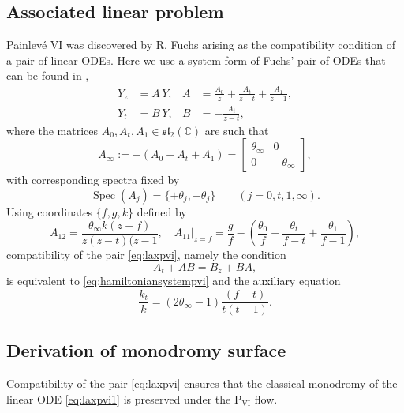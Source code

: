 \documentclass[a4paper,reqno]{amsart}
\numberwithin{equation}{section}
\newcommand\Psix{\textrm{P}_{\textrm{VI}}}
\numberwithin{equation}{section}
\begin{document}
\subsection{Associated linear problem}
Painlev\'e VI was discovered by R. Fuchs \cite{fuchs1905} arising as the compatibility condition of a pair of linear ODEs. Here we use a system form of Fuchs' pair of ODEs that can be found in \cite{jimbomiwaII1981},
\begin{subequations}\label{eq:laxpvi}
\begin{align}
  &&  Y_z&=A\,Y, & A&=\frac{A_0}{z}+\frac{A_t}{z-t}+\frac{A_1}{z-1}, && \label{eq:laxpvi1}\\
   && Y_t&=B\,Y, & B&=-\frac{A_t}{z-t}, && \label{eq:laxpvi2}
\end{align}
\end{subequations}
where the matrices $	A_0,A_t, A_1\in \mathfrak{sl}_2(\mathbb{C})$ are such that
		\begin{equation*}
	A_\infty:=-(A_0+A_t+A_1)=\begin{bmatrix}
	    \theta_\infty & 0\\
        0 & -\theta_\infty
	\end{bmatrix},
	\end{equation*}
with corresponding spectra fixed by
	\begin{equation}\label{eq:specsA}
		\operatorname{Spec}(A_j)=\{+\theta_j,-\theta_j\}\qquad (j=0,t,1,\infty).
	\end{equation}
Using coordinates $\{f,g,k\}$ defined by
\begin{equation*}
 A_{12}=\frac{\theta_\infty k(z-f)}{z(z-t)(z-1},\quad A_{11}|_{z=f}=\frac{g}{f}-\left(\frac{\theta_0}{f}+\frac{\theta_t}{f-t}+\frac{\theta_1}{f-1}\right),
\end{equation*}
compatibility of the pair \eqref{eq:laxpvi},  namely the condition
\begin{equation*}
    A_t+AB=B_z+BA,
\end{equation*}
is equivalent to \cref{eq:hamiltoniansystempvi} and the auxiliary equation
\begin{equation*}
   \frac{k_t}{k}=(2 \theta_\infty-1) \frac{(f-t)}{t(t-1)}.
\end{equation*}











\subsection{Derivation of monodromy surface}
Compatibility of the pair \eqref{eq:laxpvi} ensures that the classical monodromy of the linear ODE \eqref{eq:laxpvi1} is preserved under the $\Psix$ flow.
\end{document}
